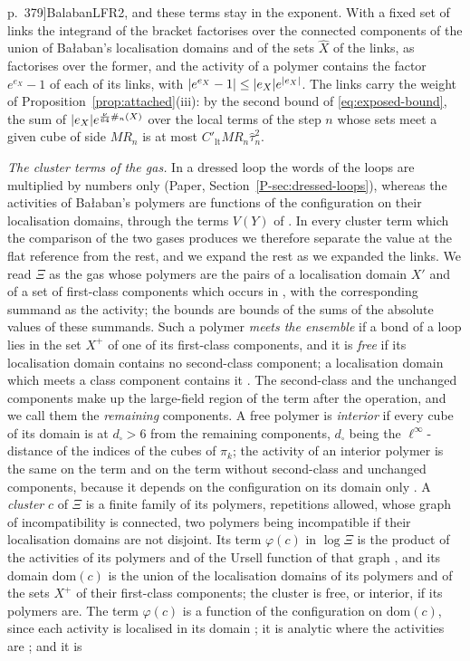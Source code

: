 \documentclass[11pt]{preprint}
\DeclarePairedDelimiter{\abs}{\lvert}{\rvert}
\numberwithin{equation}{section}
\theoremstyle{definition}
\theoremstyle{remark}
\theoremstyle{plain}
\begin{document}
p.~379]{BalabanLFR2}, and these terms stay in the exponent. With a fixed set of links the integrand of the bracket factorises over the connected components of the union of Ba{\l}aban's localisation domains and of the sets $\hat X$ of the links, as \cite[(1.90)]{BalabanLFR2} factorises over the former, and the activity of a polymer contains the factor $e^{e_X} - 1$ of each of its links, with $\abs{e^{e_X} - 1} \leq \abs{e_X}e^{\abs{e_X}}$. The links carry the weight of Proposition~\ref{prop:attached}(iii): by the second bound of \eqref{eq:exposed-bound}, the sum of $\abs{e_X}e^{\frac{\nu}{64}\#_n(X)}$ over the local terms of the step $n$ whose sets meet a given cube of side $MR_n$ is at most $C'_{\mathrm{lt}}MR_n\hat\tau_n^2$.

\emph{The cluster terms of the gas.} In a dressed loop the words of the loops are multiplied by numbers only (Paper, Section~\ref{P-sec:dressed-loops}), whereas the activities of Ba{\l}aban's polymers are functions of the configuration on their localisation domains, through the terms $V(Y)$ of \cite[(1.91)]{BalabanLFR2}. In every cluster term which the comparison of the two gases produces we therefore separate the value at the flat reference from the rest, and we expand the rest as we expanded the links. We read $\Xi$ as the gas whose polymers are the pairs of a localisation domain $X'$ and of a set of first-class components which occurs in \cite[(1.91)]{BalabanLFR2}, with the corresponding summand as the activity; the bounds \cite[(1.92)--(1.97)]{BalabanLFR2} are bounds of the sums of the absolute values of these summands. Such a polymer \emph{meets the ensemble} if a bond of a loop lies in the set $X^+$ of one of its first-class components, and it is \emph{free} if its localisation domain contains no second-class component; a localisation domain which meets a class component contains it \cite[p.~377]{BalabanLFR2}. The second-class and the unchanged components make up the large-field region of the term after the operation, and we call them the \emph{remaining} components. A free polymer is \emph{interior} if every cube of its domain is at $d_\square > 6$ from the remaining components, $d_\square$ being the $\ell^\infty$-distance of the indices of the cubes of $\pi_k$; the activity of an interior polymer is the same on the term and on the term without second-class and unchanged components, because it depends on the configuration on its domain only \cite[pp.~377, 379]{BalabanLFR2}. A \emph{cluster} $c$ of $\Xi$ is a finite family of its polymers, repetitions allowed, whose graph of incompatibility is connected, two polymers being incompatible if their localisation domains are not disjoint. Its term $\varphi(c)$ in $\log\Xi$ is the product of the activities of its polymers and of the Ursell function of that graph \cite[Chapter~5]{FriedliVelenik}, and its domain $\mathrm{dom}(c)$ is the union of the localisation domains of its polymers and of the sets $X^+$ of their first-class components; the cluster is free, or interior, if its polymers are. The term $\varphi(c)$ is a function of the configuration on $\mathrm{dom}(c)$, since each activity is localised in its domain \cite[p.~379]{BalabanLFR2}; it is analytic where the activities are \cite[(1.73)--(1.75), p.~380]{BalabanLFR2}; and it is 
\end{document}
